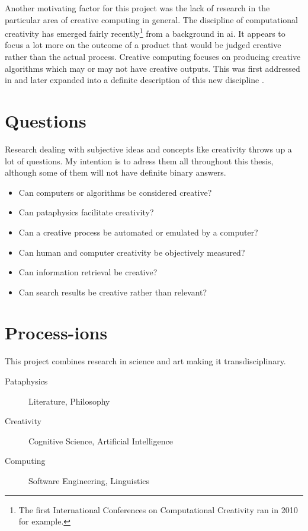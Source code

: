 Another motivating factor for this project was the lack of research in the particular area of creative computing in general. The discipline of computational creativity has emerged fairly recently\footnote{The first International Conferences on Computational Creativity ran in 2010 for example.} from a background in \gls{ai}. It appears to focus a lot more on the outcome of a product that would be judged creative rather than the actual process. Creative computing focuses on producing creative algorithms which may or may not have creative outputs. This was first addressed in \autocite{Raczinski2013} and later expanded into a definite description of this new discipline \autocite{Hugill2013c}.


\section{Questions}

Research dealing with subjective ideas and concepts like creativity throws up a lot of questions. My intention is to adress them all throughout this thesis, although some of them will not have definite binary answers.


\begin{itemize}
  \item Can computers or algorithms be considered creative?
  \item Can pataphysics facilitate creativity?
  \item Can a creative process be automated or emulated by a computer?
  \item Can human and computer creativity be objectively measured?
  \item Can information retrieval be creative?
  \item Can search results be creative rather than relevant?
\end{itemize}


\section{Process-ions}

This project combines research in science and art making it transdisciplinary.

\begin{description}
  \item [Pataphysics] Literature, Philosophy
  \item [Creativity] Cognitive Science, Artificial Intelligence
  \item [Computing] Software Engineering, Linguistics
\end{description}

